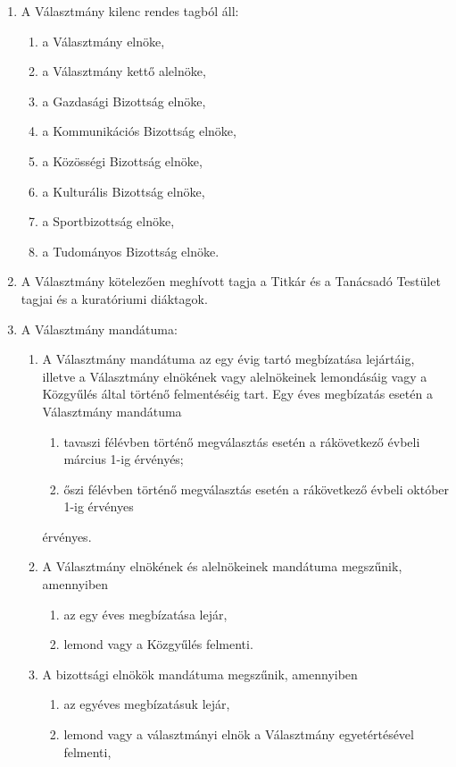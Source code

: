 \documentclass{../styles/rulebook}
\begin{document}
\begin{enumerate}
	\item A Választmány kilenc rendes tagból áll:
	\begin{enumerate}
		\item a Választmány elnöke,
		\item a Választmány kettő alelnöke,
		\item a Gazdasági Bizottság elnöke,
		\item a Kommunikációs Bizottság elnöke,
		\item a Közösségi Bizottság elnöke,
		\item a Kulturális Bizottság elnöke,
		\item a Sportbizottság elnöke,
		\item a Tudományos Bizottság elnöke.
	\end{enumerate}
	\item A Választmány kötelezően meghívott tagja a Titkár és a Tanácsadó Testület tagjai és a kuratóriumi diáktagok.
	\item A Választmány mandátuma:
	\begin{enumerate}
		\item A Választmány mandátuma az egy évig tartó megbízatása lejártáig,  illetve a Választmány elnökének vagy alelnökeinek lemondásáig vagy a Közgyűlés által történő felmentéséig tart. Egy éves megbízatás esetén a Választmány mandátuma
		\begin{enumerate}
			\item tavaszi félévben történő megválasztás esetén a rákövetkező évbeli március 1-ig érvényés;
			\item őszi félévben történő megválasztás esetén a rákövetkező évbeli október 1-ig érvényes
		\end{enumerate}
		érvényes.
		\item A Választmány elnökének és alelnökeinek mandátuma megszűnik, amennyiben
		\begin{enumerate}
			\item az egy éves megbízatása lejár,
			\item lemond vagy a Közgyűlés felmenti.
		\end{enumerate}
		\item A bizottsági elnökök mandátuma megszűnik, amennyiben
		\begin{enumerate}
			\item az egyéves megbízatásuk lejár,
			\item lemond vagy a választmányi elnök a Választmány egyetértésével felmenti,

\end{enumerate}
\end{enumerate}
\end{enumerate}
\end{document}
